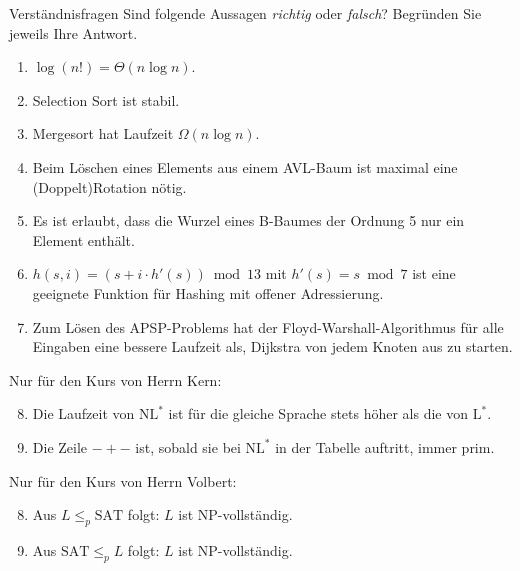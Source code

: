 \documentclass[11pt,a4paper]{article}
\begin{document}
\begin{aufgabe}{1}{Verständnisfragen}
    Sind folgende Aussagen \emph{richtig} oder \emph{falsch}?
    Begründen Sie jeweils Ihre Antwort.
    \begin{enumerate}
        \item $\log(n!) = \Theta(n \log n)$.
        \item Selection Sort ist stabil.
        \item Mergesort hat Laufzeit $\Omega(n \log n)$.
        \item Beim Löschen eines Elements aus einem AVL-Baum ist maximal eine (Doppelt)Rotation nötig.
        \item Es ist erlaubt, dass die Wurzel eines B-Baumes der Ordnung 5 nur ein Element enthält.
        \item $h(s, i) = (s + i \cdot h'(s)) \bmod 13$ mit $h'(s) = s \bmod 7$ ist eine geeignete Funktion für Hashing mit offener Adressierung.
        \item Zum Lösen des APSP-Problems hat der Floyd-Warshall-Algorithmus für alle Eingaben eine bessere Laufzeit als, Dijkstra von jedem Knoten aus zu starten.
    \end{enumerate}
    Nur für den Kurs von Herrn Kern:
    \begin{enumerate}
        \setcounter{enumi}{7}
        \item Die Laufzeit von $\mathrm{NL}^*$ ist für die gleiche Sprache stets höher als die von $\mathrm{L}^*$.
        \item Die Zeile $-+-$ ist, sobald sie bei $\mathrm{NL}^*$ in der Tabelle auftritt, immer prim.
    \end{enumerate}
    Nur für den Kurs von Herrn Volbert:
    \begin{enumerate}
        \setcounter{enumi}{7}
        \item Aus $L \leq_p \mathrm{SAT}$ folgt: $L$ ist NP-vollständig.
        \item Aus $\mathrm{SAT} \leq_p L$ folgt: $L$ ist NP-vollständig.
    \end{enumerate}
\end{aufgabe}
\end{document}
